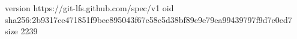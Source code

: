 version https://git-lfs.github.com/spec/v1
oid sha256:2b9317ce471851f9bee895043f67c58c5d38bf89e9e79ea99439797f9d7e0ed7
size 2239

